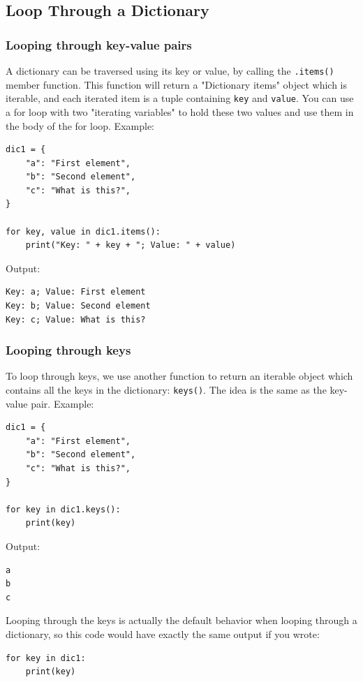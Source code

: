 \documentclass[12pt]{book}
\begin{document}
\subsection{Loop Through a Dictionary}
\label{sec:org02f7b6f}
\subsubsection{Looping through key-value pairs}
\label{sec:org61aeac6}
A dictionary can be traversed using its key or value, by calling the \texttt{.items()} member function. This function will return a "Dictionary items" object which is iterable, and each iterated item is a tuple containing \texttt{key} and \texttt{value}. You can use a for loop with two "iterating variables" to hold these two values and use them in the body of the for loop. Example:
\begin{verbatim}
dic1 = {
    "a": "First element",
    "b": "Second element",
    "c": "What is this?",
}

for key, value in dic1.items():
    print("Key: " + key + "; Value: " + value)
\end{verbatim}
Output:
\begin{verbatim}
Key: a; Value: First element
Key: b; Value: Second element
Key: c; Value: What is this?
\end{verbatim}
\subsubsection{Looping through keys}
\label{sec:org2b887fb}
To loop through keys, we use another function to return an iterable object which contains all the keys in the dictionary: \texttt{keys()}. The idea is the same as the key-value pair. Example:
\begin{verbatim}
dic1 = {
    "a": "First element",
    "b": "Second element",
    "c": "What is this?",
}

for key in dic1.keys():
    print(key)
\end{verbatim}
Output:
\begin{verbatim}
a
b
c
\end{verbatim}

Looping through the keys is actually the default behavior when looping through a dictionary, so this code would have exactly the same output if you wrote:
\begin{verbatim}
for key in dic1:
    print(key)
\end{verbatim}
\end{document}
